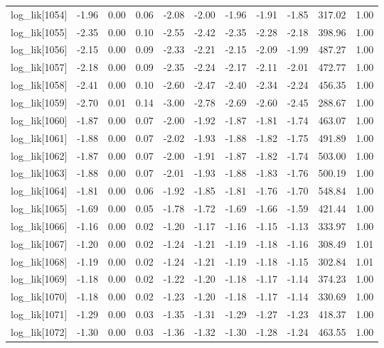 \begin{table}[ht]
\begin{tabular}{rrrrrrrrrrr}
  log\_lik[1054] & -1.96 & 0.00 & 0.06 & -2.08 & -2.00 & -1.96 & -1.91 & -1.85 & 317.02 & 1.00 \\ 
  log\_lik[1055] & -2.35 & 0.00 & 0.10 & -2.55 & -2.42 & -2.35 & -2.28 & -2.18 & 398.96 & 1.00 \\ 
  log\_lik[1056] & -2.15 & 0.00 & 0.09 & -2.33 & -2.21 & -2.15 & -2.09 & -1.99 & 487.27 & 1.00 \\ 
  log\_lik[1057] & -2.18 & 0.00 & 0.09 & -2.35 & -2.24 & -2.17 & -2.11 & -2.01 & 472.77 & 1.00 \\ 
  log\_lik[1058] & -2.41 & 0.00 & 0.10 & -2.60 & -2.47 & -2.40 & -2.34 & -2.24 & 456.35 & 1.00 \\ 
  log\_lik[1059] & -2.70 & 0.01 & 0.14 & -3.00 & -2.78 & -2.69 & -2.60 & -2.45 & 288.67 & 1.00 \\ 
  log\_lik[1060] & -1.87 & 0.00 & 0.07 & -2.00 & -1.92 & -1.87 & -1.81 & -1.74 & 463.07 & 1.00 \\ 
  log\_lik[1061] & -1.88 & 0.00 & 0.07 & -2.02 & -1.93 & -1.88 & -1.82 & -1.75 & 491.89 & 1.00 \\ 
  log\_lik[1062] & -1.87 & 0.00 & 0.07 & -2.00 & -1.91 & -1.87 & -1.82 & -1.74 & 503.00 & 1.00 \\ 
  log\_lik[1063] & -1.88 & 0.00 & 0.07 & -2.01 & -1.93 & -1.88 & -1.83 & -1.76 & 500.19 & 1.00 \\ 
  log\_lik[1064] & -1.81 & 0.00 & 0.06 & -1.92 & -1.85 & -1.81 & -1.76 & -1.70 & 548.84 & 1.00 \\ 
  log\_lik[1065] & -1.69 & 0.00 & 0.05 & -1.78 & -1.72 & -1.69 & -1.66 & -1.59 & 421.44 & 1.00 \\ 
  log\_lik[1066] & -1.16 & 0.00 & 0.02 & -1.20 & -1.17 & -1.16 & -1.15 & -1.13 & 333.97 & 1.00 \\ 
  log\_lik[1067] & -1.20 & 0.00 & 0.02 & -1.24 & -1.21 & -1.19 & -1.18 & -1.16 & 308.49 & 1.01 \\ 
  log\_lik[1068] & -1.19 & 0.00 & 0.02 & -1.24 & -1.21 & -1.19 & -1.18 & -1.15 & 302.84 & 1.01 \\ 
  log\_lik[1069] & -1.18 & 0.00 & 0.02 & -1.22 & -1.20 & -1.18 & -1.17 & -1.14 & 374.23 & 1.00 \\ 
  log\_lik[1070] & -1.18 & 0.00 & 0.02 & -1.23 & -1.20 & -1.18 & -1.17 & -1.14 & 330.69 & 1.00 \\ 
  log\_lik[1071] & -1.29 & 0.00 & 0.03 & -1.35 & -1.31 & -1.29 & -1.27 & -1.23 & 418.37 & 1.00 \\ 
  log\_lik[1072] & -1.30 & 0.00 & 0.03 & -1.36 & -1.32 & -1.30 & -1.28 & -1.24 & 463.55 & 1.00 \\ 

\end{tabular}
\end{table}
